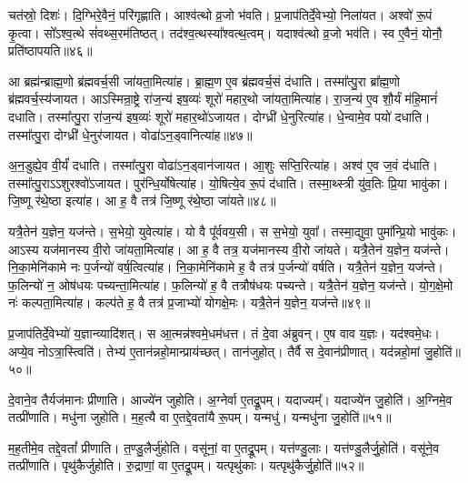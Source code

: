 चत॑स्रो॒ दिशः॑।
दि॒ग्भिरे॒वैनं॒ परि॑गृह्णाति।
आश्व॑त्थो व्र॒जो भ॑वति।
प्र॒जाप॑तिर्दे॒वेभ्यो॒ निला॑यत।
अश्वो॑ रू॒पं कृ॒त्वा।
सो᳚ऽश्व॒त्थे सं॑वथ्स॒रम॑तिष्ठत्।
तद॑श्व॒त्थस्या᳚श्वत्थ॒त्वम्।
यदाश्व॑त्थो व्र॒जो भव॑ति।
स्व ए॒वैनं॒ योनौ॒ प्रति॑\-ष्ठापयति॥४६॥\anuvakamend[त्रि॒ष्टुभ॒श्छन्द॒सोऽधि॒ निर्मि॑मीते जुहोति॒ नव॑ च]

आ ब्रह्म॑न्ब्राह्म॒णो ब्र॑ह्मवर्च॒सी जा॑यता॒मित्या॑ह।
ब्रा॒ह्म॒ण ए॒व ब्र॑ह्मवर्च॒सं द॑धाति।
तस्मा᳚त्पु॒रा ब्रा᳚ह्म॒णो ब्र॑ह्मवर्च॒स्य॑जायत।
आऽस्मिन्रा॒ष्ट्रे रा॑ज॒न्य॑ इष॒व्यः॑ शूरो॑ महार॒थो जा॑यता॒मित्या॑ह।
रा॒ज॒न्य॑ ए॒व शौ॒र्यं म॑हि॒मानं॑ दधाति।
तस्मा᳚त्पु॒रा रा॑ज॒न्य॑ इष॒व्यः॑ शूरो॑ महार॒थो॑\-ऽजायत।
दोग्ध्री॑ धे॒नुरित्या॑ह।
धे॒न्वामे॒व पयो॑ दधाति।
तस्मा᳚त्पु॒रा दोग्ध्री॑ धे॒नुर॑जायत।
वोढा॑\-ऽन॒ड्वानित्या॑ह॥४७॥

अ॒न॒डुह्ये॒व वी॒र्यं॑ दधाति।
तस्मा᳚त्पु॒रा वोढा॑\-ऽन॒ड्वान॑जायत।
आ॒शुः सप्ति॒रित्या॑ह।
अश्व॑ ए॒व ज॒वं द॑धाति।
तस्मा᳚त्पु॒रा\-ऽऽशुरश्वो॑\-ऽजायत।
पुर॑न्धि॒र्योषेत्या॑ह।
यो॒षित्ये॒व रू॒पं द॑धाति।
तस्मा॒थ्स्त्री यु॑व॒तिः प्रि॒या भावु॑का।
जि॒ष्णू र॑थे॒ष्ठा इत्या॑ह।
आ ह॒ वै तत्र॑ जि॒ष्णू र॑थे॒ष्ठा जा॑यते॥४८॥

यत्रै॒तेन॑ य॒ज्ञेन॒ यज॑न्ते।
स॒भेयो॒ युवेत्या॑ह।
यो वै पू᳚र्ववय॒सी।
स स॒भेयो॒ युवा᳚।
तस्मा॒द्युवा॒ पुमा᳚न्प्रि॒यो भावु॑कः।
आऽस्य यज॑मानस्य वी॒रो जा॑यता॒मित्या॑ह।
आ ह॒ वै तत्र॒ यज॑मानस्य वी॒रो जा॑यते।
यत्रै॒तेन॑ य॒ज्ञेन॒ यज॑न्ते।
नि॒का॒मेनि॑कामे नः प॒र्जन्यो॑ वर्\mbox{}ष॒त्वित्या॑ह।
नि॒का॒मेनि॑कामे ह॒ वै तत्र॑ प॒र्जन्यो॑ वर्\mbox{}षति।
यत्रै॒तेन॑ य॒ज्ञेन॒ यज॑न्ते।
फ॒लिन्यो॑ न॒ ओष॑धयः पच्यन्ता॒मित्या॑ह।
फ॒लिन्यो॑ ह॒ वै तत्रौष॑धयः पच्यन्ते।
यत्रै॒तेन॑ य॒ज्ञेन॒ यज॑न्ते।
यो॒ग॒क्षे॒मो नः॑ कल्पता॒मित्या॑ह।
कल्प॑ते ह॒ वै तत्र॑ प्र॒जाभ्यो॑ योगक्षे॒मः।
यत्रै॒तेन॑ य॒ज्ञेन॒ यज॑न्ते॥४९॥\anuvakamend[अ॒न॒ड्वानित्या॑ह जायते वर्‌\mbox{}षति स॒प्त च॑]

प्र॒जाप॑तिर्दे॒वेभ्यो॑ य॒ज्ञान्व्यादि॑शत्।
स आ॒त्मन्न॑श्वमे॒धम॑धत्त।
तं दे॒वा अ॑ब्रुवन्।
ए॒ष वाव य॒ज्ञः।
यद॑श्वमे॒धः।
अप्ये॒व नोऽत्रा॒स्त्विति॑।
तेभ्य॑ ए॒तान॑न्नहो॒मान्प्राय॑च्छत्।
तान॑जुहोत्।
तैर्वै स दे॒वान॑प्रीणात्।
यद॑न्नहो॒मां जु॒होति॑॥५०॥

दे॒वाने॒व तैर्यज॑मानः प्रीणाति।
आज्ये॑न जुहोति।
अ॒ग्नेर्वा ए॒तद्रू॒पम्।
यदाज्यम्᳚।
यदाज्ये॑न जु॒होति॑।
अ॒ग्निमे॒व तत्प्री॑णाति।
मधु॑ना जुहोति।
म॒ह॒त्यै वा ए॒तद्दे॒वता॑यै रू॒पम्।
यन्मधु॑।
यन्मधु॑ना जु॒होति॑॥५१॥

म॒ह॒तीमे॒व तद्दे॒वतां᳚ प्रीणाति।
त॒ण्डु॒लैर्जु॑होति।
वसू॑नां॒ वा ए॒तद्रू॒पम्।
यत्त॑ण्डु॒लाः।
यत्त॑ण्डु॒लैर्जु॒होति॑।
वसू॑ने॒व तत्प्री॑णाति।
पृथु॑कैर्जुहोति।
रु॒द्राणां॒ वा ए॒तद्रू॒पम्।
यत्पृथु॑काः।
यत्पृथु॑कैर्जु॒होति॑॥५२॥

